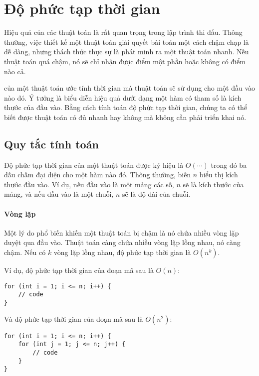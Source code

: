 \chapter{Độ phức tạp thời gian}


Hiệu quả của các thuật toán là rất quan trọng trong lập trình thi đấu.
Thông thường, việc thiết kế một thuật toán
giải quyết bài toán một cách chậm chạp là dễ dàng,
nhưng thách thức thực sự là phát minh ra một
thuật toán nhanh.
Nếu thuật toán quá chậm, nó sẽ chỉ nhận được điểm một phần hoặc không có điểm nào cả.

 của một thuật toán
ước tính thời gian mà thuật toán sẽ sử dụng
cho một đầu vào nào đó.
Ý tưởng là biểu diễn hiệu quả
dưới dạng một hàm có tham số là kích thước của đầu vào.
Bằng cách tính toán độ phức tạp thời gian,
chúng ta có thể biết được thuật toán có đủ nhanh hay không
mà không cần phải triển khai nó.

\section{Quy tắc tính toán}

Độ phức tạp thời gian của một thuật toán
được ký hiệu là $O(\cdots)$
trong đó ba dấu chấm đại diện cho một
hàm nào đó.
Thông thường, biến $n$ biểu thị
kích thước đầu vào.
Ví dụ, nếu đầu vào là một mảng các số,
$n$ sẽ là kích thước của mảng,
và nếu đầu vào là một chuỗi,
$n$ sẽ là độ dài của chuỗi.

\subsubsection*{Vòng lặp}

Một lý do phổ biến khiến một thuật toán bị chậm là
nó chứa nhiều vòng lặp duyệt qua đầu vào.
Thuật toán càng chứa nhiều vòng lặp lồng nhau,
nó càng chậm.
Nếu có $k$ vòng lặp lồng nhau,
độ phức tạp thời gian là $O(n^k)$.

Ví dụ, độ phức tạp thời gian của đoạn mã sau là $O(n)$:
\begin{lstlisting}
for (int i = 1; i <= n; i++) {
    // code
}
\end{lstlisting}

Và độ phức tạp thời gian của đoạn mã sau là $O(n^2)$:
\begin{lstlisting}
for (int i = 1; i <= n; i++) {
    for (int j = 1; j <= n; j++) {
        // code
    }
}
\end{lstlisting}

